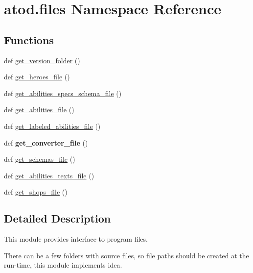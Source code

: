 \hypertarget{namespaceatod_1_1files}{}\section{atod.\+files Namespace Reference}
\label{namespaceatod_1_1files}
\subsection*{Functions}
\begin{DoxyCompactItemize}
\item 
def \hyperlink{namespaceatod_1_1files_a5a7f85ae1a4a86e521d73ce0f6e58793}{get\+\_\+version\+\_\+folder} ()
\item 
def \hyperlink{namespaceatod_1_1files_ade0ac674c88cbe72e25447b6709fc8df}{get\+\_\+heroes\+\_\+file} ()
\item 
def \hyperlink{namespaceatod_1_1files_a0f81c5ba30f606e7e037daea691f9d51}{get\+\_\+abilities\+\_\+specs\+\_\+schema\+\_\+file} ()
\item 
def \hyperlink{namespaceatod_1_1files_adb46b8fb420fab3bf4b0891ebbdf4260}{get\+\_\+abilities\+\_\+file} ()
\item 
def \hyperlink{namespaceatod_1_1files_a5bb1223fd6a3c8281c54ebd3eb596413}{get\+\_\+labeled\+\_\+abilities\+\_\+file} ()
\item 
def {\bfseries get\+\_\+converter\+\_\+file} ()\hypertarget{namespaceatod_1_1files_ace196d4c5fceb721f0abcd8f8005ec71}{}\label{namespaceatod_1_1files_ace196d4c5fceb721f0abcd8f8005ec71}

\item 
def \hyperlink{namespaceatod_1_1files_a35f094d575949cc90573ad3e877575b5}{get\+\_\+schemas\+\_\+file} ()
\item 
def \hyperlink{namespaceatod_1_1files_a460070e2d4bf8fe7b26e8a318a05c741}{get\+\_\+abilities\+\_\+texts\+\_\+file} ()
\item 
def \hyperlink{namespaceatod_1_1files_a525392eac9fe7f1b8b4dc7a015e626a7}{get\+\_\+shops\+\_\+file} ()
\end{DoxyCompactItemize}


\subsection{Detailed Description}
\begin{DoxyVerb}This module provides interface to program files.

    There can be a few folders with source files, so file paths should be 
    created at the run-time, this module implements idea.
\end{DoxyVerb}
 

